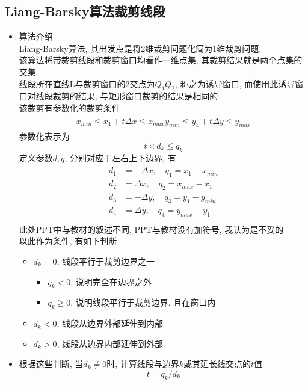 \documentclass[a4paper,UTF8]{article}
\theoremstyle{definition}
\begin{document}
\subsection{Liang-Barsky算法裁剪线段}
\begin{itemize}
  \item 算法介绍\\
  Liang-Barsky算法\cite{rog_2002}, 其出发点是将2维裁剪问题化简为1维裁剪问题. \\
  该算法将带裁剪线段和裁剪窗口均看作一维点集, 其裁剪结果就是两个点集的交集.\\
  线段所在直线L与裁剪窗口的2交点为$Q_1Q_2$, 称之为诱导窗口, 而使用此诱导窗口对线段裁剪的结果, 与矩形窗口裁剪的结果是相同的\\
  该裁剪有参数化的裁剪条件\begin{align}
    \begin{split}
      x_{min} \leq x_1 + t\Delta x\leq x_{max}
      y_{min} \leq y_1 + t\Delta y\leq y_{max}
    \end{split}
  \end{align}
  参数化表示为$$t\times d_k\leq q_k$$
  定义参数$d, q$, 分别对应于左右上下边界, 有
  \begin{align}
    \begin{split}
      d_1 &= -\Delta x, \quad q_1 = x_1-x_{min}\\
      d_2 &= \Delta x, \quad q_2 = x_{max}-x_1\\
      d_3 &= -\Delta y, \quad q_3 = y_1-y_{min}\\
      d_4 &= \Delta y, \quad q_4 = y_{max}-y_1\\
    \end{split}
  \end{align}
  此处PPT中与教材\cite{sun_2006}的叙述不同, PPT与教材没有加符号, 我认为是不妥的\\
  以此作为条件, 有如下判断\begin{itemize}
    \item $d_k=0$, 线段平行于裁剪边界之一\begin{itemize}
      \item $q_k<0$, 说明完全在边界之外
      \item $q_k\geq 0$, 说明线段平行于裁剪边界, 且在窗口内
    \end{itemize}
    \item $d_k<0$, 线段从边界外部延伸到内部
    \item $d_k>0$, 线段从边界内部延伸到外部
  \end{itemize}
  \item 根据这些判断, 当$d_k\ne 0$时, 计算线段与边界$k$或其延长线交点的$t$值$$t=q_k/d_k$$

\end{itemize}
\end{document}
